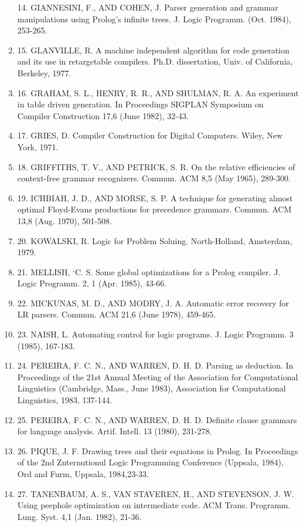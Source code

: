 \begin{enumerate}
14. GIANNESINI, F., AND COHEN, J. Parser generation and grammar manipulations using Prolog’s
infinite trees. J. Logic Programm. (Oct. 1984), 253-265.
  \item 
15. GLANVILLE, R. A machine independent algorithm for code generation and its use in retargetable
compilers. Ph.D. dissertation, Univ. of California, Berkeley, 1977.
  \item 
16. GRAHAM, S. L., HENRY, R. R., AND SHULMAN, R. A. An experiment in table driven generation.
In Proceedings SIGPLAN Symposium on Compiler Construction 17,6 (June 1982), 32-43.
  \item 
17. GRIES, D. Compiler Construction for Digital Computers. Wiley, New York, 1971. 
  \item 
18. GRIFFITHS, T. V., AND PETRICK, S. R. On the relative efficiencies of context-free grammar
recognizers. Commun. ACM 8,5 (May 1965), 289-300.
  \item 
19. ICHBIAH, J. D., AND MORSE, S. P. A technique for generating almost optimal Floyd-Evans
productions for precedence grammars. Commun. ACM 13,8 (Aug. 1970), 501-508.
  \item 
20. KOWALSKI, R. Logic for Problem Soluing. North-Holland, Amsterdam, 1979.
  \item 
21. MELLISH, ‘C. S. Some global optimizations for a Prolog compiler. J. Logic Programm. 2, 1
(Apr. 1985), 43-66.
  \item 
22. MICKUNAS, M. D., AND MODRY, J. A. Automatic error recovery for LR parsers. Commun. ACM
21,6 (June 1978), 459-465.
  \item 
23. NAISH, L. Automating control for logic programs. J. Logic Programm. 3 (1985), 167-183.
  \item 
24. PEREIRA, F. C. N., AND WARREN, D. H. D. Parsing as deduction. In Proceedings of the 21st
Annual Meeting of the Association for Computational Linguistics (Cambridge, Mass., June 1983),
Association for Computational Linguistics, 1983, 137-144.
  \item 
25. PEREIRA, F. C. N., AND WARREN, D. H. D. Definite clause grammars for language analysis.
Artif. Intell. 13 (1980), 231-278.
  \item 
26. PIQUE, J. F. Drawing trees and their equations in Prolog. In Proceedings of the 2nd Znternutionul
Logic Programming Conference (Uppsala, 1984), Ord and Furm, Uppsala, 1984,23-33.
  \item 
27. TANENBAUM, A. S., VAN STAVEREN, H., AND STEVENSON, J. W. Using peephole optimization
on intermediate code. ACM Trans. Programm. Lung. Syst. 4,1 (Jan. 1982), 21-36.

\end{enumerate}

